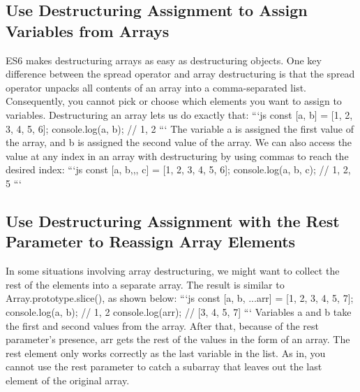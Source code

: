 \documentclass{article}%
\begin{document}
\subsection{Use Destructuring Assignment to Assign Variables from Arrays}%
\label{subsec:UseDestructuringAssignmenttoAssignVariablesfromArrays}%
ES6 makes destructuring arrays as easy as destructuring objects.\newline%
One key difference between the spread operator and array destructuring is that the spread operator unpacks all contents of an array into a comma{-}separated list. Consequently, you cannot pick or choose which elements you want to assign to variables.\newline%
Destructuring an array lets us do exactly that:\newline%
```js\newline%
const {[}a, b{]} = {[}1, 2, 3, 4, 5, 6{]};\newline%
console.log(a, b); // 1, 2\newline%
```\newline%
The variable a is assigned the first value of the array, and b is assigned the second value of the array.\newline%
We can also access the value at any index in an array with destructuring by using commas to reach the desired index:\newline%
```js\newline%
const {[}a, b,,, c{]} = {[}1, 2, 3, 4, 5, 6{]};\newline%
console.log(a, b, c); // 1, 2, 5\newline%
```\newline%

%
\subsection{Use Destructuring Assignment with the Rest Parameter to Reassign Array Elements}%
\label{subsec:UseDestructuringAssignmentwiththeRestParametertoReassignArrayElements}%
In some situations involving array destructuring, we might want to collect the rest of the elements into a separate array.\newline%
The result is similar to Array.prototype.slice(), as shown below:\newline%
```js\newline%
const {[}a, b, ...arr{]} = {[}1, 2, 3, 4, 5, 7{]};\newline%
console.log(a, b); // 1, 2\newline%
console.log(arr); // {[}3, 4, 5, 7{]}\newline%
```\newline%
Variables a and b take the first and second values from the array. After that, because of the rest parameter's presence, arr gets the rest of the values in the form of an array.\newline%
The rest element only works correctly as the last variable in the list. As in, you cannot use the rest parameter to catch a subarray that leaves out the last element of the original array.\newline%
\end{document}
